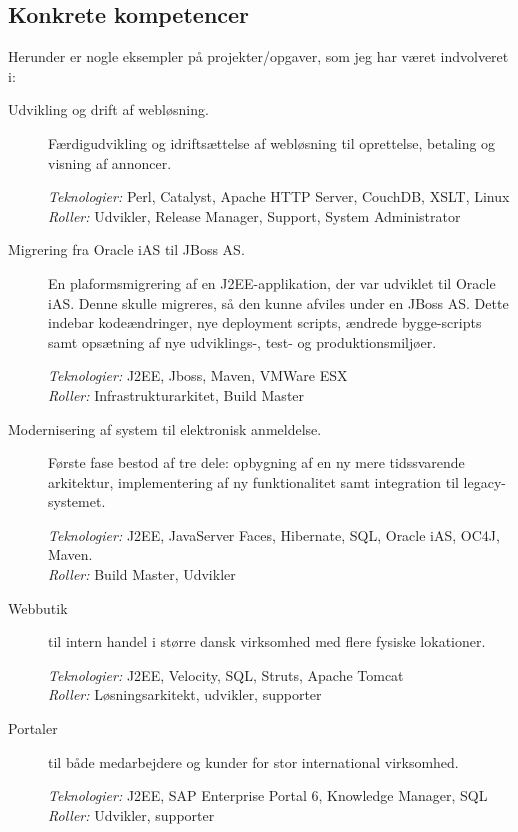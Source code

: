 \documentclass[a4paper,11pt]{article}
\begin{document}
\subsection*{Konkrete kompetencer}

Herunder er nogle eksempler på projekter/opgaver, som jeg har været
indvolveret i:

\begin{description}

\item[Udvikling og drift af webløsning.] Færdigudvikling og
  idriftsættelse af webløsning til oprettelse,
  betaling og visning af annoncer.

  \textit{Teknologier:} Perl, Catalyst, Apache HTTP Server, CouchDB, XSLT, Linux\\
  \textit{Roller:} Udvikler, Release Manager, Support, System Administrator

\item[Migrering fra Oracle iAS til JBoss AS.] En
  plaformsmigrering af en J2EE-applikation, der var udviklet til
  Oracle iAS. Denne skulle migreres, så den kunne afviles under
  en JBoss AS. Dette indebar kodeændringer, nye deployment
  scripts, ændrede bygge-scripts samt opsætning af nye
  udviklings-, test- og produktionsmiljøer.

  \textit{Teknologier:} J2EE, Jboss, Maven, VMWare ESX\\
  \textit{Roller:} Infrastrukturarkitet, Build Master

\item[Modernisering af system til elektronisk anmeldelse.]
  Første fase bestod af tre dele: opbygning af en ny mere
  tidssvarende arkitektur, implementering af ny
  funktionalitet samt integration til legacy-systemet.

  \textit{Teknologier:} J2EE, JavaServer Faces, Hibernate, SQL, Oracle
  iAS, OC4J, Maven.\\
  \textit{Roller:} Build Master, Udvikler

\item[Webbutik] til intern handel i større dansk virksomhed
  med flere fysiske lokationer.

  \textit{Teknologier:} J2EE, Velocity, SQL, Struts, Apache Tomcat\\
  \textit{Roller:} Løsningsarkitekt, udvikler, supporter

\item[Portaler] til både medarbejdere og kunder for stor
  international virksomhed.

  \textit{Teknologier:} J2EE, SAP Enterprise Portal 6, Knowledge Manager, SQL\\
  \textit{Roller:} Udvikler, supporter


\end{description}
\end{document}

